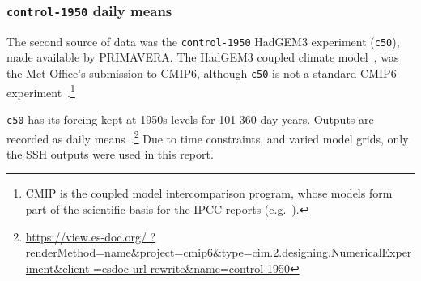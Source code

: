 \subsubsection{\texttt{control-1950} daily means}

\label{sec:control-1950-intro}

The second source of data was the \texttt{control-1950} HadGEM3 experiment (\texttt{c50}),
made available by PRIMAVERA.
The HadGEM3 coupled climate model~\cite{williams2018met, FurtherInfo},
 was the Met Office's submission to CMIP6,
although \texttt{c50} is not a standard CMIP6 experiment~\cite{eyring2016overview}.\footnote{
CMIP is the coupled model intercomparison program,
whose models form part of the scientific basis for the IPCC
reports (e.g.~\cite{SROCC}).}

\texttt{c50} has its forcing kept at
1950s levels for 101 360-day years. Outputs are recorded as daily
means~\cite{williams2018met, FurtherInfo}.\footnote{\url{https://view.es-doc.org/
        ?renderMethod=name&project=cmip6&type=cim.2.designing.NumericalExperiment&client
        =esdoc-url-rewrite&name=control-1950}}
Due to time constraints, and varied model grids, only the SSH outputs were used in this report.
